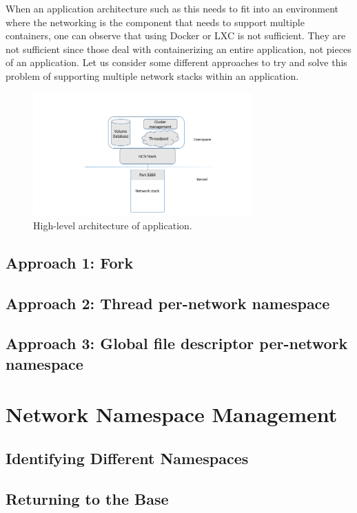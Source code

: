 \documentclass[letterpaper]{article}
\begin{document}
When an application architecture such as this needs to fit into an environment where the networking is the component that needs to support multiple containers, one can observe that using Docker or LXC is not sufficient. They are not sufficient since those deal with containerizing an entire application, not pieces of an application. Let us consider some different approaches to try and solve this problem of supporting multiple network stacks within an application.

\begin{figure}[h]
\includegraphics[width=3.31in]{standard-app-overview.png}
\caption{High-level architecture of application.}
\label{app-overview}
\end{figure}

\subsection{Approach 1: Fork}

\subsection{Approach 2: Thread per-network namespace}

\subsection{Approach 3: Global file descriptor per-network namespace}

\section{Network Namespace Management}

\subsection{Identifying Different Namespaces}

\subsection{Returning to the Base}
\end{document}
